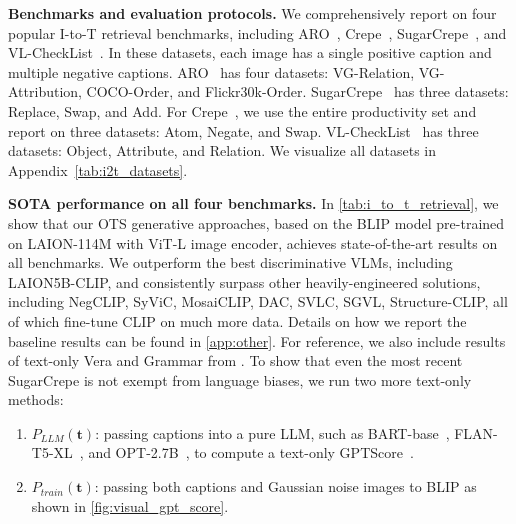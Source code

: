 \documentclass{article} \usepackage{iclr2024_conference,times}
\begin{document}
{\bf Benchmarks and evaluation protocols.} We comprehensively report on four popular I-to-T retrieval benchmarks, including ARO~\citep{aro}, Crepe~\citep{crepe}, SugarCrepe~\cite{sugarcrepe}, and VL-CheckList~\citep{vlchecklist}. In these datasets, each image has a single positive caption and multiple negative captions. ARO~\citep{aro} has four datasets: VG-Relation, VG-Attribution, COCO-Order, and Flickr30k-Order. SugarCrepe~\citep{sugarcrepe} has three datasets: Replace, Swap, and Add. For Crepe~\citep{crepe}, we use the entire productivity set and report on three datasets: Atom, Negate, and Swap. VL-CheckList~\citep{vlchecklist} has three datasets: Object, Attribute, and Relation. We visualize all datasets in Appendix~\autoref{tab:i2t_datasets}.







{\bf SOTA performance on all four benchmarks. } In \autoref{tab:i_to_t_retrieval}, we show that our OTS generative approaches, based on the BLIP model pre-trained on LAION-114M with ViT-L image encoder, achieves state-of-the-art results on all benchmarks. We outperform the best discriminative VLMs, including LAION5B-CLIP, and consistently surpass other heavily-engineered solutions, including NegCLIP, SyViC, MosaiCLIP, DAC, SVLC, SGVL, Structure-CLIP, all of which fine-tune CLIP on much more data. Details on how we report the baseline results can be found in \autoref{app:other}. For reference, we also include results of text-only Vera and Grammar from \citet{sugarcrepe}. To show that even the most recent SugarCrepe is not exempt from language biases, we run two more text-only methods:
\begin{enumerate}
    \item $P_{LLM}(\mathbf{t})$: passing captions into a pure LLM, such as BART-base~\citep{bartscore}, FLAN-T5-XL~\citep{flan}, and OPT-2.7B~\citep{opt}, to compute a text-only GPTScore~\citep{fu2023gptscore}.
    \item $P_{train}(\mathbf{t})$: passing both captions and Gaussian noise images to BLIP as shown in \autoref{fig:visual_gpt_score}.
\end{enumerate}
\end{document}
